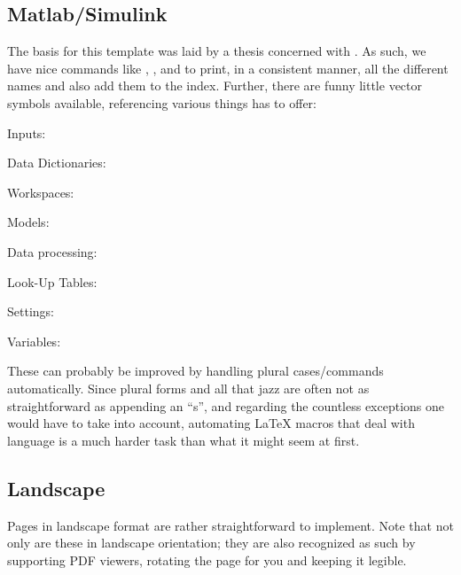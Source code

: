 \subsection{Matlab/Simulink}
The basis for this template was laid by a thesis concerned with \mtlbsmlnk{}.
As such, we have nice commands like \mtlb{}, \smlnk{}, \mtlbsmlnk{} and \mtlbsymb{} to print, in a consistent manner, all the different names and also add them to the index.
Further, there are funny little vector symbols available, referencing various things \mtlbsmlnk{} has to offer:
\begin{description}
	\item Inputs: \SimulinkStep{} \quad \SimulinkSteps{}
	\item Data Dictionaries: \SimulinkDD{} \quad \SimulinkDDs{}
	\item Workspaces: \SimulinkBaseWS{} \quad \SimulinkModelWS{} \quad \SimulinkModelWSs{}
	\item Models: \SimulinkModel{} \quad \SimulinkModels{} \quad \SimulinkRefM{} \quad \SimulinkRefMs{} \quad \SimulinkLibM{} \quad \SimulinkLibMs{} \quad \SimulinkLibrary{} \quad \SimulinkLibraries{}
	\item Data processing: \SimulinkLogData{}
	\item Look-Up Tables: \SimulinkLUT{} \quad \SimulinkLUTs{}
	\item Settings: \SimulinkConfiguration{}
	\item Variables:  \quad \MatlabStruct{} \quad \MatlabStructs{} \quad \MatlabTable{} \quad \MatlabTables{} \quad {} \quad {} \quad \SimulinkBus{} \quad \SimulinkBuses{}
\end{description}
These can probably be improved by handling plural cases/commands automatically.
Since plural forms and all that jazz are often not as straightforward as appending an \enquote{s}, and regarding the countless exceptions one would have to take into account, automating \LaTeX{} macros that deal with language is a much harder task than what it might seem at first.
\begin{landscape}
\section{Landscape}

Pages in landscape format are rather straightforward to implement.
Note that not only are these in landscape orientation; they are also recognized as such by supporting PDF viewers, rotating the page for you and keeping it legible.
\end{landscape}
